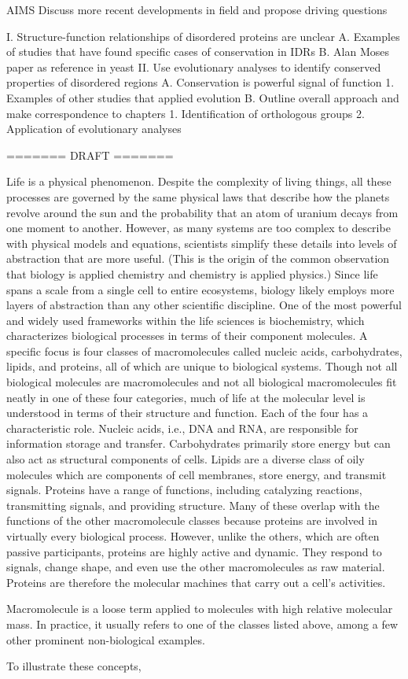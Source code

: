 AIMS
Discuss more recent developments in field and propose driving questions

I. Structure-function relationships of disordered proteins are unclear
    A. Examples of studies that have found specific cases of conservation in IDRs
    B. Alan Moses paper as reference in yeast
II. Use evolutionary analyses to identify conserved properties of disordered regions
    A. Conservation is powerful signal of function
        1. Examples of other studies that applied evolution
    B. Outline overall approach and make correspondence to chapters
        1. Identification of orthologous groups
        2. Application of evolutionary analyses

======= DRAFT =======

Life is a physical phenomenon. Despite the complexity of living things, all these processes are governed by the same physical laws that describe how the planets revolve around the sun and the probability that an atom of uranium decays from one moment to another. However, as many systems are too complex to describe with physical models and equations, scientists simplify these details into levels of abstraction that are more useful. (This is the origin of the common observation that biology is applied chemistry and chemistry is applied physics.) Since life spans a scale from a single cell to entire ecosystems, biology likely employs more layers of abstraction than any other scientific discipline. One of the most powerful and widely used frameworks within the life sciences is biochemistry, which characterizes biological processes in terms of their component molecules. A specific focus is four classes of macromolecules called nucleic acids, carbohydrates, lipids, and proteins, all of which are unique to biological systems. Though not all biological molecules are macromolecules and not all biological macromolecules fit neatly in one of these four categories, much of life at the molecular level is understood in terms of their structure and function. Each of the four has a characteristic role. Nucleic acids, i.e., DNA and RNA, are responsible for information storage and transfer. Carbohydrates primarily store energy but can also act as structural components of cells. Lipids are a diverse class of oily molecules which are components of cell membranes, store energy, and transmit signals. Proteins have a range of functions, including catalyzing reactions, transmitting signals, and providing structure. Many of these overlap with the functions of the other macromolecule classes because proteins are involved in virtually every biological process. However, unlike the others, which are often passive participants, proteins are highly active and dynamic. They respond to signals, change shape, and even use the other macromolecules as raw material. Proteins are therefore the molecular machines that carry out a cell's activities.

Macromolecule is a loose term applied to molecules with high relative molecular mass. In practice, it usually refers to one of the classes listed above, among a few other prominent non-biological examples.

To illustrate these concepts,